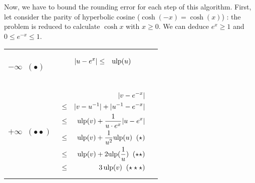 \documentclass[12pt]{amsart}
\def\ulp{{\rm ulp}}
\begin{document}
Now, we have to bound the rounding error for each step of this
algorithm.  First, let consider the parity of hyperbolic cosine
($\cosh(-x)=\cosh(x)$) : the problem is reduced to calculate $\cosh x$
with $x \geq 0$. We can deduce $e^x \geq 1$ and $0 \leq e^{-x} \leq
1$.



\begin{center}
\begin{tabular}{l l l}

\begin{minipage}{2.5cm}


${\textnormal{error}}(u)$


$u \leftarrow o(e^x)$\\
$-\infty \;\; (\bullet)$

\end{minipage} &
\begin{minipage}{7.5cm}

\begin{eqnarray}\nonumber
  |u-e^x| &\leq& \ulp(u)\\\nonumber
\end{eqnarray}

\end{minipage} &
\begin{minipage}{6cm}
{\hspace{7cm}}
\end{minipage}\\%
\begin{minipage}{2.5cm}
${\textnormal{error}}(v)$


$v \leftarrow o({u}^{-1}) $\\
$+\infty \;\; (\bullet\bullet)$ 
\end{minipage} &
\begin{minipage}{7.5cm}



\begin{eqnarray}\nonumber
  &&|v-e^{-x}| \\\nonumber
  &       \leq&  |v - u^{-1}| +  |u^{-1}  - e^{-x}|\\\nonumber
  &       \leq& \ulp(v) + \frac{1}{u \cdot e^x} |u-e^{x}|\\\nonumber
  &       \leq& \ulp(v) + \frac{1}{u^2} \ulp(u)\;\;(\star)\\\nonumber
  &       \leq& \ulp(v) + 2 \ulp(\frac{1}{u})\;\;(\star\star)\\\nonumber
  &       \leq& 3 \, \ulp(v)\;\;(\star\star\star)
\end{eqnarray}



\end{minipage}
\end{tabular}
\end{center}
\end{document}
